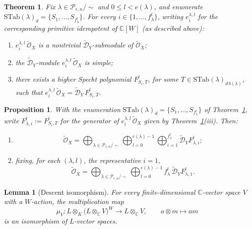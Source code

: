 \documentclass[10pt,a4paper]{amsart}
\newtheorem{theorem}{Theorem}
\newtheorem{proposition}{Proposition}
\newtheorem{lemma}{Lemma}
\begin{document}
\begin{theorem}\label{thm:main-general}
Fix $\lambda \in \mathcal{P}_{r,n}/\sim$ and $0 \le l < e(\lambda)$,
and enumerate $\mathrm{STab}(\lambda)_d = \{S_1,\dots,S_{f^l_\lambda}\}$.
For every $i \in \{1,\dots,f^l_\lambda\}$, writing $e^{\lambda,l}_i$
for the corresponding primitive idempotent of $\mathbb{C}[W]$
(as described above):
\begin{enumerate}[label=(\roman*)]
 \item $e^{\lambda,l}_i\,\widetilde{\mathcal{O}}_X$ is a nontrivial
 $\widetilde{\mathcal{D}}_Y$-submodule of $\widetilde{\mathcal{O}}_X$;
 \item the $\widetilde{\mathcal{D}}_Y$-module
 $e^{\lambda,l}_i\,\widetilde{\mathcal{O}}_X$ is simple;
 \item there exists a higher Specht polynomial $F^l_{S_i,T}$, for some
 $T \in \mathrm{STab}(\lambda)_{d\,b(\lambda)}$, such that
 $e^{\lambda,l}_i\,\widetilde{\mathcal{O}}_X = \widetilde{\mathcal{D}}_Y \, F^l_{S_i,T}$.
\end{enumerate}
\end{theorem}

\begin{proposition}\label{prop:decomposition-general}
With the enumeration $\mathrm{STab}(\lambda)_d = \{S_1,\dots,S_{f^l_\lambda}\}$
of Theorem~\ref{thm:main-general}, write
$F^l_{\lambda,i} := F^l_{S_i,T}$ for the generator of
$e^{\lambda,l}_i\,\widetilde{\mathcal O}_X$ given by
Theorem~\ref{thm:main-general}(iii). Then:
\begin{enumerate}[label=(\roman*)]
\item
\[
 \widetilde{\mathcal{O}}_X
 = \bigoplus_{\lambda \in \mathcal{P}_{r,n}/\sim} \bigoplus_{l=0}^{e(\lambda)-1}
 \bigoplus_{i=1}^{f^l_\lambda} \widetilde{\mathcal{D}}_Y F^l_{\lambda,i} ;
\]
\item fixing, for each $(\lambda,l)$, the representative $i=1$,
\[
 \widetilde{\mathcal{O}}_X
 = \bigoplus_{\lambda \in \mathcal{P}_{r,n}/\sim} \bigoplus_{l=0}^{e(\lambda)-1}
 f^l_\lambda \, \widetilde{\mathcal{D}}_Y F^l_{\lambda,1}.
\]
\end{enumerate}
\end{proposition}

\begin{lemma}[Descent isomorphism]\label{lem:descent-iso}
For every finite-dimensional $\mathbb{C}$-vector space $V$ with a
$W$-action, the multiplication map
\[
  \mu_V : L \otimes_K \big(L \otimes_{\mathbb{C}} V\big)^{W} \longrightarrow L \otimes_{\mathbb{C}} V,
  \qquad a \otimes m \longmapsto am
\]
is an isomorphism of $L$-vector spaces.
\end{lemma}
\end{document}
